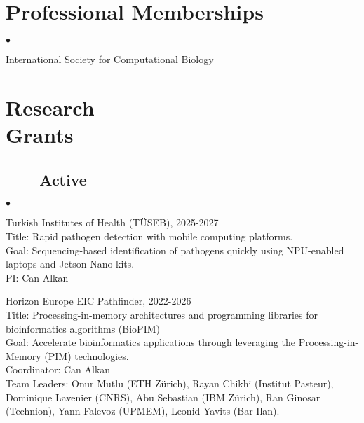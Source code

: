 \documentclass[margin,line]{res}
\newenvironment{list2}{
  \begin{list}{$\bullet$}{%
      \setlength{\itemsep}{0.1cm}
      \setlength{\parsep}{0in} \setlength{\parskip}{0in}
      \setlength{\topsep}{0in} \setlength{\partopsep}{0in} 
      \setlength{\leftmargin}{0.2in}}}{\end{list}}
\newenvironment{list4}{
  \begin{list}{$\bullet$}{%
      \setlength{\itemsep}{0cm}
      \setlength{\parsep}{0in} \setlength{\parskip}{0in}
      \setlength{\topsep}{0in} \setlength{\partopsep}{0in} 
      \setlength{\leftmargin}{0.2in}}}{\end{list}}
\begin{document}
\begin{resume}
\section{\sc Professional Memberships}
    \begin{list4}
        \item International Society for Computational Biology%
    \end{list4}


\section{\sc Research \\ Grants}

\vspace{-0.4cm}

    \subsection{\small \sc ~~~~Active}
  \begin{list2}
    \item 
    Turkish Institutes of Health (TÜSEB), 2025-2027\\
    Title:  Rapid pathogen detection with mobile computing platforms.\\
    Goal: Sequencing-based identification of pathogens quickly using NPU-enabled laptops and Jetson Nano kits.\\ 
    PI: Can Alkan
    
    \item
    Horizon Europe EIC Pathfinder, 2022-2026\\
    Title: Processing-in-memory architectures and programming libraries for bioinformatics algorithms (BioPIM)\\
    Goal: Accelerate bioinformatics applications through leveraging the Processing-in-Memory (PIM) technologies.\\
    Coordinator: Can Alkan\\
    Team Leaders: Onur Mutlu (ETH Zürich), Rayan Chikhi (Institut Pasteur), Dominique Lavenier (CNRS), Abu Sebastian (IBM Zürich), Ran Ginosar (Technion), Yann Falevoz (UPMEM), Leonid Yavits (Bar-Ilan).
    

\end{list2}
\end{resume}
\end{document}
